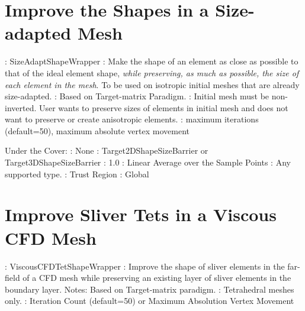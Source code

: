  
\section{Improve the Shapes in a Size-adapted Mesh} \label{sec:SizeAdaptShapeWrapper}

: SizeAdaptShapeWrapper \newline
{}: Make the shape of an element as close as possible to that
of the ideal element shape, {\it while preserving, as much as possible, the size of each element in the mesh}. To be used on isotropic initial meshes that are already size-adapted. \newline
{}: Based on Target-matrix Paradigm. \newline
{}: Initial mesh must be non-inverted. 
User wants to preserve sizes of elements in initial mesh and does not want to preserve or 
create anisotropic elements.  \newline 
{}: maximum iterations (default=50), maximum absolute vertex movement \newline \newline

\noindent Under the Cover: \newline
{}: None \newline
{}: Target2DShapeSizeBarrier or Target3DShapeSizeBarrier \newline
{}: 1.0 \newline
{}: Linear Average over the Sample Points \newline
{}: Any supported type. \newline
{}: Trust Region \newline
{}: Global \newline


\section{Improve Sliver Tets in a Viscous CFD Mesh} \label{sec:ViscousCFDTetShapeWrapper}

: ViscousCFDTetShapeWrapper \newline
{}: Improve the shape of sliver elements in the far-field 
of a CFD mesh while 
preserving an existing layer of sliver elements in the boundary layer. \newline
\noindent Notes: Based on Target-matrix paradigm.  \newline
{}: Tetrahedral meshes only.  \newline 
{}: Iteration Count (default=50) or Maximum Absolution Vertex Movement \newline \newline
 
